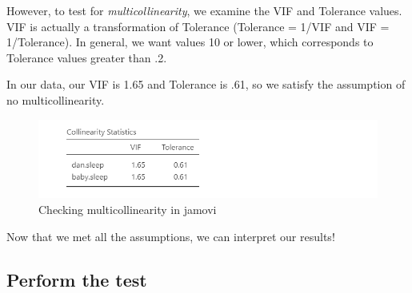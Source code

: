 \documentclass[
]{book}
\begin{document}
However, to test for \emph{multicollinearity}, we examine the VIF and Tolerance values. VIF is actually a transformation of Tolerance (Tolerance = 1/VIF and VIF = 1/Tolerance). In general, we want values 10 or lower, which corresponds to Tolerance values greater than .2.

In our data, our VIF is 1.65 and Tolerance is .61, so we satisfy the assumption of no multicollinearity.

\begin{figure}

{\centering \includegraphics[width=1\linewidth]{images/13-regression/regression-multicollinearity} 

}

\caption{Checking multicollinearity in jamovi}\label{fig:unnamed-chunk-9}
\end{figure}

Now that we met all the assumptions, we can interpret our results!

\hypertarget{perform-the-test-10}{%
\subsection{Perform the test}\label{perform-the-test-10}}
\end{document}
